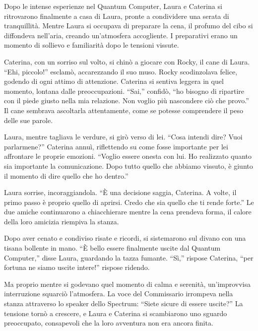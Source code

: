 
Dopo le intense esperienze nel Quantum Computer, Laura e Caterina si ritrovarono finalmente a casa di Laura, pronte a condividere una serata di tranquillità. Mentre Laura si occupava di preparare la cena, il profumo del cibo si diffondeva nell’aria, creando un’atmosfera accogliente. I preparativi erano un momento di sollievo e familiarità dopo le tensioni vissute.

Caterina, con un sorriso sul volto, si chinò a giocare con Rocky, il cane di Laura. “Ehi, piccolo!” esclamò, accarezzando il suo muso. Rocky scodinzolava felice, godendo di ogni attimo di attenzione. Caterina si sentiva leggera in quel momento, lontana dalle preoccupazioni. “Sai,” confidò, “ho bisogno di ripartire con il piede giusto nella mia relazione. Non voglio più nascondere ciò che provo.” Il cane sembrava ascoltarla attentamente, come se potesse comprendere il peso delle sue parole.

Laura, mentre tagliava le verdure, si girò verso di lei. “Cosa intendi dire? Vuoi parlarmene?” Caterina annuì, riflettendo su come fosse importante per lei affrontare le proprie emozioni. “Voglio essere onesta con lui. Ho realizzato quanto sia importante la comunicazione. Dopo tutto quello che abbiamo vissuto, è giunto il momento di dire quello che ho dentro.”

Laura sorrise, incoraggiandola. “È una decisione saggia, Caterina. A volte, il primo passo è proprio quello di aprirsi. Credo che sia quello che ti rende forte.” Le due amiche continuarono a chiacchierare mentre la cena prendeva forma, il calore della loro amicizia riempiva la stanza.

Dopo aver cenato e condiviso risate e ricordi, si sistemarono sul divano con una tisana bollente in mano. “È bello essere finalmente uscite dal Quantum Computer,” disse Laura, guardando la tazza fumante. “Sì,” rispose Caterina, “per fortuna ne siamo uscite intere!” rispose ridendo.

Ma proprio mentre si godevano quel momento di calma e serenità, un’improvvisa interruzione squarciò l’atmosfera. La voce del Commissario irrompeva nella stanza attraverso lo speaker dello Spectrum: “Siete sicure di essere uscite?” La tensione tornò a crescere, e Laura e Caterina si scambiarono uno sguardo preoccupato, consapevoli che la loro avventura non era ancora finita.
